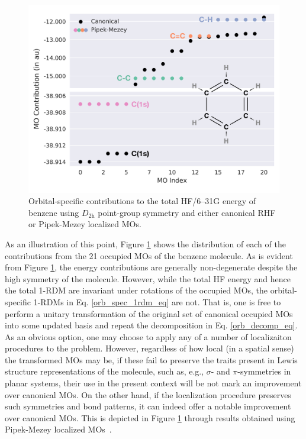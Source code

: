 \documentclass[journal=jctc,manuscript=article]{achemso}
\begin{document}
%
\begin{figure}[ht]
\begin{center}
\includegraphics[width=\textwidth]{figures/c6h6_hf_2.pdf}
\caption{Orbital-specific contributions to the total HF/6--31G energy of benzene using $D_{2\text{h}}$ point-group symmetry and either canonical RHF or Pipek-Mezey localized MOs.}
\label{c6h6_hf_fig}
\end{center}
\end{figure}
%
As an illustration of this point, Figure \ref{c6h6_hf_fig} shows the distribution of each of the contributions from the 21 occupied MOs of the benzene molecule. As is evident from Figure \ref{c6h6_hf_fig}, the energy contributions are generally non-degenerate despite the high symmetry of the molecule. However, while the total HF energy and hence the total 1-RDM are invariant under rotations of the occupied MOs, the orbital-specific 1-RDMs in Eq. \ref{orb_spec_1rdm_eq} are not. That is, one is free to perform a unitary transformation of the original set of canonical occupied MOs into some updated basis and repeat the decomposition in Eq. \ref{orb_decomp_eq}. As an obvious option, one may choose to apply any of a number of localizaiton procedures to the problem. However, regardless of how local (in a spatial sense) the transformed MOs may be, if these fail to preserve the traits present in Lewis structure representations of the molecule, such as, e.g., $\sigma$- and $\pi$-symmetries in planar systems, their use in the present context will be not mark an improvement over canonical MOs. On the other hand, if the localization procedure preserves such symmetries and bond patterns, it can indeed offer a notable improvement over canonical MOs. This is depicted in Figure \ref{c6h6_hf_fig} through results obtained using Pipek-Mezey localized MOs~\cite{pipek_mezey_jcp_1989}.\\
\end{document}
